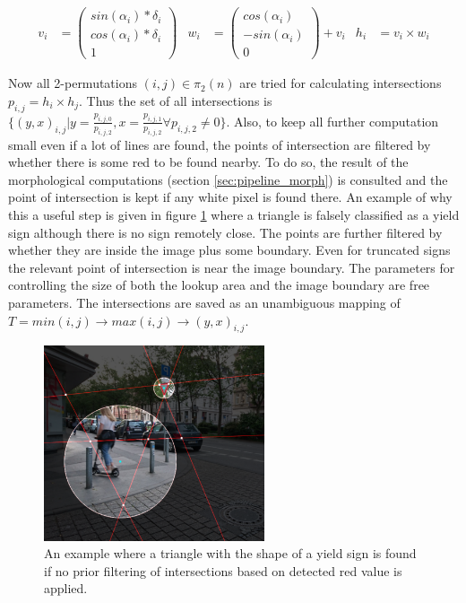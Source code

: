 \documentclass{report}
\begin{document}
\begin{align}\label{eq:poi}
  v_i & = \begin{pmatrix}
    sin(\alpha_i) * \delta_i \\ cos(\alpha_i) * \delta_i \\ 1
  \end{pmatrix}
  &
  w_i & = \begin{pmatrix}
    cos(\alpha_i) \\ -sin(\alpha_i) \\ 0
  \end{pmatrix} + v_i
  &
  h_i & = v_i \times w_i
\end{align}

Now all 2-permutations \( (i, j) \in \pi_2(n) \) are tried for
calculating intersections \( p_{i,j} = h_i \times h_j \). Thus the set
of all intersections is \(\{ (y, x)_{i, j} | y = \frac{p_{i, j,
    0}}{p_{i, j, 2}}, x = \frac{p_{i, j, 1}}{p_{i, j, 2}} \forall
p_{i, j, 2} \neq 0 \}\). Also, to keep all further computation small
even if a lot of lines are found, the points of intersection are
filtered by whether there is some red to be found nearby. To do so,
the result of the morphological computations (section
\ref{sec:pipeline_morph}) is consulted and the point of intersection
is kept if any white pixel is found there. An example of why this a
useful step is given in figure \ref{img:red_detection} where a
triangle is falsely classified as a yield sign although there is no
sign remotely close. The points are further filtered by whether they
are inside the image plus some boundary. Even for truncated signs the
relevant point of intersection is near the image boundary. The
parameters for controlling the size of both the lookup area and the
image boundary are free parameters. The intersections are saved as an
unambiguous mapping of \( T = min(i, j) \to max(i, j) \to (y, x)_{i,
  j} \).

\begin{figure}
  \begin{center}
    \includegraphics[width=0.58\textwidth]{src/red_detection}
  \end{center}
  \caption{An example where a triangle with the shape of a yield sign
    is found if no prior filtering of intersections based on detected
    red value is applied.}
  \label{img:red_detection}
\end{figure}
\end{document}
